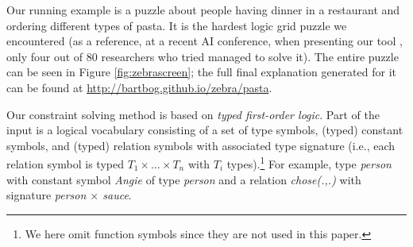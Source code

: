 Our running example is a puzzle about people having dinner in a restaurant and ordering different types of pasta. It is the hardest logic grid puzzle we encountered (as a reference, at a recent AI conference, when presenting our tool \cite{DBLP:conf/bnaic/ClaesBCGG19}, only four out of 80 researchers who tried managed to solve it).    
The entire puzzle can be seen in Figure \ref{fig:zebrascreen}; the full final explanation generated for it can be found at \url{http://bartbog.github.io/zebra/pasta}.

Our constraint solving method is based on \emph{typed first-order logic}. %
Part of the input is a logical vocabulary consisting of a set of type symbols, (typed) constant symbols, and (typed) relation symbols with associated type signature (i.e., each relation symbol is typed $T_1\times \dots \times T_n$ with $T_i$ types).\footnote{We here omit function symbols since they are not used in this paper.} For example, type \textit{person} with constant symbol \textit{Angie} of type \textit{person} and a relation \textit{chose(.,.)} with signature \textit{person $\times$ sauce}.



